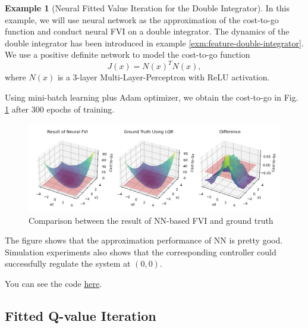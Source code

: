 \documentclass[
]{book}
\theoremstyle{definition}
\theoremstyle{definition}
\newtheorem{example}{Example}[chapter]
\theoremstyle{definition}
\theoremstyle{definition}
\theoremstyle{remark}
\begin{document}
\begin{example}[Neural Fitted Value Iteration for the Double Integrator]
\protect\hypertarget{exm:NNbased-double-tegrator}{}\label{exm:NNbased-double-tegrator}In this example, we will use neural network as the approximation of the cost-to-go function and conduct neural FVI on a double integrator. The dynamics of the double integrator has been introduced in example \ref{exm:feature-double-integrator}. We use a positive definite network to model the cost-to-go function
\begin{equation}
    J(x) = N(x)^T N(x),
\end{equation}
where \(N(x)\) is a 3-layer Multi-Layer-Perceptron with ReLU activation.

Using mini-batch learning plus Adam optimizer, we obtain the cost-to-go in Fig. \ref{fig:double-integrator-NN-example} after 300 epochs of training.

\begin{figure}

{\centering \includegraphics[width=0.9\linewidth]{images/approxdp-NN-FVI} 

}

\caption{Comparison between the result of NN-based FVI and ground truth}\label{fig:double-integrator-NN-example}
\end{figure}

The figure shows that the approximation performance of NN is pretty good. Simulation experiments also shows that the corresponding controller could successfully regulate the system at \((0,0)\).

You can see the code \href{https://github.com/ComputationalRobotics/OptimalControlEstimation-Examples/tree/main/Neural-FVI}{here}.
\end{example}

\hypertarget{fitted-q-value-iteration}{%
\subsection{Fitted Q-value Iteration}\label{fitted-q-value-iteration}}
\end{document}
